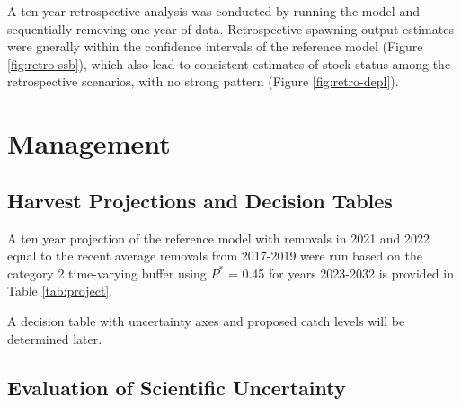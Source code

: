 \documentclass[11pt,
  english,
  a4paper,
]{article}
\begin{document}

A ten-year retrospective analysis was conducted by running the model and sequentially removing one year of data. Retrospective spawning output estimates were gnerally within the confidence intervals of the reference model (Figure \ref{fig:retro-ssb}), which also lead to consistent estimates of stock status among the retrospective scenarios, with no strong pattern (Figure \ref{fig:retro-depl}).

\leavevmode\tagmcend\tagstructend\par


\hypertarget{management}{%
\section{Management}\label{management}}

\leavevmode\tagmcend\tagstructend


\hypertarget{harvest-projections-and-decision-tables}{%
\subsection{Harvest Projections and Decision Tables}\label{harvest-projections-and-decision-tables}}

\leavevmode\tagmcend\tagstructend


A ten year projection of the reference model with removals in 2021 and 2022 equal to the recent average removals from 2017-2019 were run based on the category 2 time-varying buffer using {\(P^*\)\leavevmode\tagmcend\tagstructend} = 0.45 for years 2023-2032 is provided in Table \ref{tab:project}.

\leavevmode\tagmcend\tagstructend\par


A decision table with uncertainty axes and proposed catch levels will be determined later.

\leavevmode\tagmcend\tagstructend\par


\hypertarget{evaluation-of-scientific-uncertainty}{%
\subsection{Evaluation of Scientific Uncertainty}\label{evaluation-of-scientific-uncertainty}}
\end{document}
